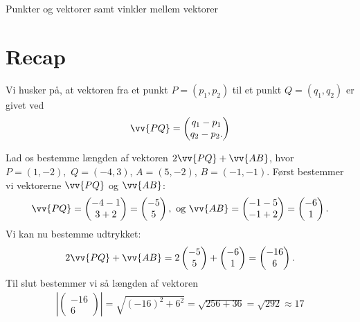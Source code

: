 
\begin{center}
\Huge
Punkter og vektorer samt vinkler mellem vektorer
\end{center}

\section*{Recap}

Vi husker på, at vektoren fra et punkt $P = (p_1,p_2)$ til et punkt $Q = (q_1,q_2)$ er givet ved
\begin{align*} 
\vv{PQ} = \begin{pmatrix} q_1-p_1\\ q_2-p_2.
\end{pmatrix}
\end{align*}
\begin{exa}
Lad os bestemme længden af vektoren $2 \vv{PQ} + \vv{AB}$, hvor $P = (1,-2),$ $Q = (-4,3)$, $A = (5,-2)$, $B = (-1,-1)$.
Først bestemmer vi vektorerne $\vv{PQ}$ og $\vv{AB}$:
\begin{align*}
\vv{PQ} = \begin{pmatrix} -4-1\\3+2\end{pmatrix}=\begin{pmatrix} -5\\5\end{pmatrix}, \textnormal{ og }\vv{AB} = \begin{pmatrix} -1-5\\-1+2\end{pmatrix} = \begin{pmatrix} -6\\1\end{pmatrix}.
\end{align*}
Vi kan nu bestemme udtrykket:
\begin{align*}
2 \vv{PQ} + \vv{AB} = 2\begin{pmatrix}-5 \\ 5\end{pmatrix} + \begin{pmatrix}-6 \\ 1\end{pmatrix} = \begin{pmatrix}-16 \\ 6\end{pmatrix}.
\end{align*}
Til slut bestemmer vi så længden af vektoren
\begin{align*}
\left|\begin{pmatrix}-16 \\ 6\end{pmatrix} \right| = \sqrt{(-16)^2+6^2} = \sqrt{256+36} = \sqrt{292} \approx 17
\end{align*}
\end{exa}

